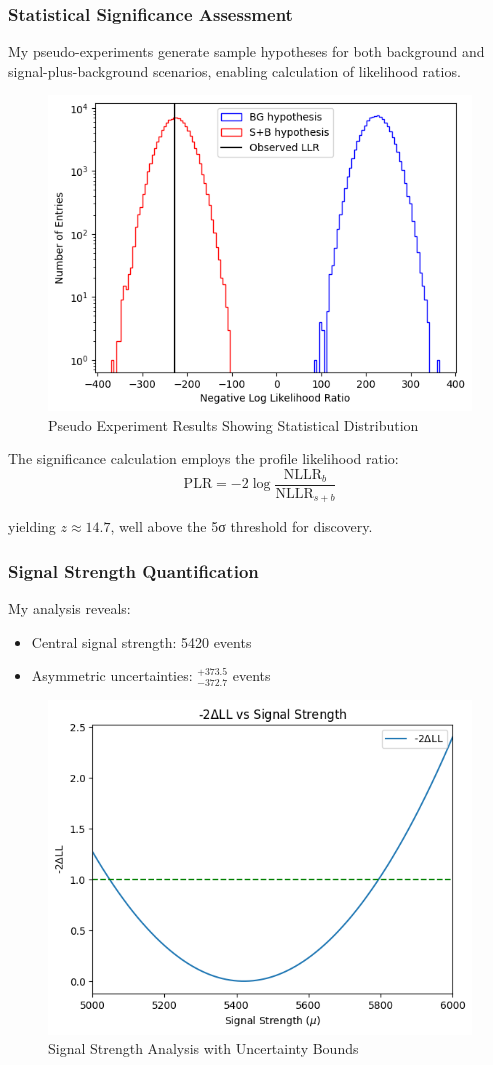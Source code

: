 \documentclass{article}
\begin{document}
\subsubsection{Statistical Significance Assessment}
My pseudo-experiments generate sample hypotheses for both background and signal-plus-background scenarios, enabling calculation of likelihood ratios.

\begin{figure}[h]
\centering
\includegraphics[width=0.5\linewidth]{4.png}
\caption{Pseudo Experiment Results Showing Statistical Distribution}
\end{figure}

The significance calculation employs the profile likelihood ratio:
\[
    \text{PLR} = -2\log\frac{\text{NLLR}_b}{\text{NLLR}_{s+b}}
\]

yielding \(z \approx 14.7\), well above the 5σ threshold for discovery.

\subsubsection{Signal Strength Quantification}
My analysis reveals:
\begin{itemize}
    \item Central signal strength: 5420 events
    \item Asymmetric uncertainties: \(^{+373.5}_{-372.7}\) events
\end{itemize}

\begin{figure}[h]
\centering
\includegraphics[width=0.5\linewidth]{5.png}
\caption{Signal Strength Analysis with Uncertainty Bounds}
\end{figure}
\end{document}

